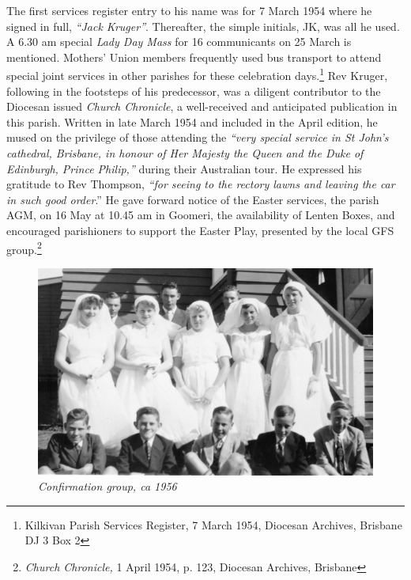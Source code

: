 The first services register entry to his name was for 7 March 1954 where he signed in full, \emph{``Jack Kruger''}. Thereafter, the simple initials, JK, was all he used. A 6.30 am special \emph{Lady Day Mass} for 16 communicants on 25 March is mentioned. Mothers' Union members frequently used bus transport to attend special joint services in other parishes for these celebration days.\footnote{Kilkivan Parish Services Register, 7 March 1954, Diocesan Archives, Brisbane DJ 3 Box 2} Rev Kruger, following in the footsteps of his predecessor, was a diligent contributor to the Diocesan issued \emph{Church Chronicle}, a well-received and anticipated publication in this parish. Written in late March 1954 and included in the April edition, he mused on the privilege of those attending the \emph{``very special service in St John's cathedral, Brisbane, in honour of Her Majesty the Queen and the Duke of Edinburgh, Prince Philip,''} during their Australian tour. He expressed his gratitude to Rev Thompson, \emph{``for seeing to the rectory lawns and leaving the car in such good order}.'' He gave forward notice of the Easter services, the parish AGM, on 16 May at 10.45 am in Goomeri, the availability of Lenten Boxes, and encouraged parishioners to support the Easter Play, presented by the local GFS group.\footnote{\emph{Church Chronicle,} 1 April 1954, p. 123, Diocesan Archives, Brisbane}








\begin{figure}[!htb]
\begin{center}
\includegraphics[width=1.\textwidth,center]{../images/confirmation1956.jpg}
\caption{\itshape Confirmation group, ca 1956}
\end{center}
\end{figure}




